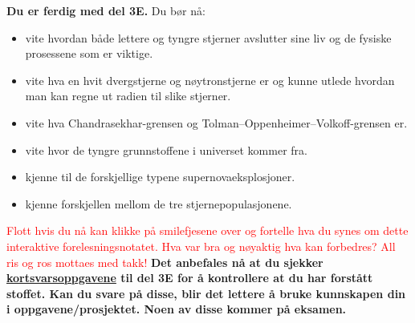 \documentclass{beamer}
\let\hrefori\href
\renewcommand{\href}[2]{{\setlength{\fboxsep}{1pt}\colorbox{sunset}{\hrefori{#1}{#2}}}}
\newcommand{\pagebutton}[1]{\setbeamertemplate{button}{\tikz\node[inner xsep = 5pt, draw = structure!90, fill = green(ryb), rounded corners = 8pt]{\color{amber}\Large\insertbuttontext};}\beamerbutton{#1}}
\begin{document}
\begin{frame}
\label{oppsummering}
\hyperlink{feil_nd4}{\pagebutton{\small Forrige side}}\href{https://nettskjema.no/a/168692}{ \Changey[1][yellow]{-2}}
{\bf  Du er ferdig med del 3E.} Du bør nå:
\begin{itemize}
\item  vite hvordan både lettere og tyngre stjerner avslutter sine liv og de fysiske prosessene som er viktige.
\item  vite hva en hvit dvergstjerne og nøytronstjerne er og kunne utlede hvordan man kan regne ut radien til slike stjerner.
\item  vite hva Chandrasekhar-grensen og Tolman–Oppenheimer–Volkoff-grensen er.
\item  vite hvor de tyngre grunnstoffene i universet kommer fra.
\item  kjenne til de forskjellige typene supernovaeksplosjoner.
\item  kjenne forskjellen mellom de tre stjernepopulasjonene.
\end{itemize}
\textcolor{red}{Flott hvis du nå kan klikke på smilefjesene over og fortelle hva du synes om dette interaktive forelesningsnotatet. Hva var bra og nøyaktig hva kan forbedres? All ris og ros mottaes med takk!}
{\bf Det anbefales nå at du sjekker \href{https://www.uio.no/studier/emner/matnat/astro/AST2000/h21/undervisningsmateriell/kortsvarsoppgaver/del3e.pdf}{kortsvarsoppgavene} til del 3E for å kontrollere at du har forstått stoffet. Kan du svare på disse, blir det lettere å bruke kunnskapen din i oppgavene/prosjektet. Noen av disse kommer på eksamen.}
\end{frame}
\end{document}
